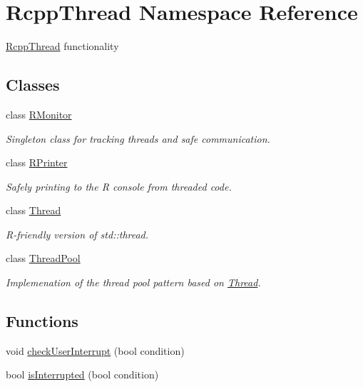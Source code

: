 \hypertarget{namespace_rcpp_thread}{}\section{Rcpp\+Thread Namespace Reference}
\label{namespace_rcpp_thread}


{\ttfamily \hyperlink{namespace_rcpp_thread}{Rcpp\+Thread}} functionality  


\subsection*{Classes}
\begin{DoxyCompactItemize}
\item 
class \hyperlink{class_rcpp_thread_1_1_r_monitor}{R\+Monitor}
\begin{DoxyCompactList}\small\item\em Singleton class for tracking threads and safe communication. \end{DoxyCompactList}\item 
class \hyperlink{class_rcpp_thread_1_1_r_printer}{R\+Printer}
\begin{DoxyCompactList}\small\item\em Safely printing to the R console from threaded code. \end{DoxyCompactList}\item 
class \hyperlink{class_rcpp_thread_1_1_thread}{Thread}
\begin{DoxyCompactList}\small\item\em R-\/friendly version of {\ttfamily std\+::thread}. \end{DoxyCompactList}\item 
class \hyperlink{class_rcpp_thread_1_1_thread_pool}{Thread\+Pool}
\begin{DoxyCompactList}\small\item\em Implemenation of the thread pool pattern based on {\ttfamily \hyperlink{class_rcpp_thread_1_1_thread}{Thread}}. \end{DoxyCompactList}\end{DoxyCompactItemize}
\subsection*{Functions}
\begin{DoxyCompactItemize}
\item 
void \hyperlink{namespace_rcpp_thread_ade67c61ac7a988425ba74d9ac56b4327}{check\+User\+Interrupt} (bool condition)
\item 
bool \hyperlink{namespace_rcpp_thread_a9696a4fe6aae79039e0a6ccdd4aab365}{is\+Interrupted} (bool condition)
\end{DoxyCompactItemize}


